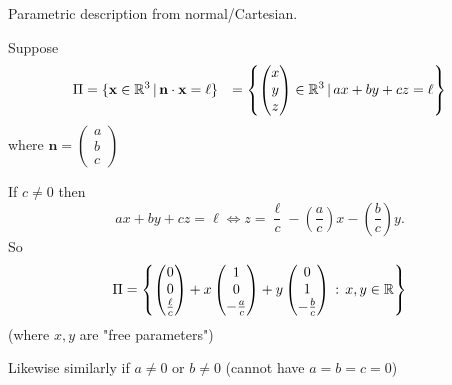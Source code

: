 \documentclass[10pt, a4paper]{article}
\newcommand{\mbf}[1]{\mathbf{#1}}
\begin{document}
Parametric description from normal/Cartesian.

Suppose 
\begin{align*}
    \Pi &= \{\mbf{x} \in \R ^ 3 \,|\, \mbf{n\cdot x} = \ell\}
    &= \left\{\begin{pmatrix} x \\ y \\ z
    \end{pmatrix} \in \R ^ 3 \,|\, ax + by + cz = \ell\right\}
\end{align*}
where $\mbf{n} = \begin{pmatrix} a \\ b \\ c \end{pmatrix}$

If $c \neq 0$ then \[
ax + by + cz = \ell \iff z = \frac{\ell}{c} - \left(\frac{a}{c}\right)x - \left(\frac{b}{c}\right)y.
\]
So
\[
\Pi = \left\{ \begin{pmatrix}
    0 \\ 0 \\ \frac{\ell}{c}
\end{pmatrix} + x\begin{pmatrix}
    1 \\ 0 \\ -\frac{a}{c} 
\end{pmatrix} + y\begin{pmatrix}
    0 \\ 1 \\ -\frac{b}{c}
\end{pmatrix}\,:\, x, y \in \mathbb{R} \right\}
\]
(where $x, y$ are "free parameters")

Likewise similarly if $a \neq 0$ or $b \neq 0$ (cannot have $a = b = c = 0$)
\end{document}

